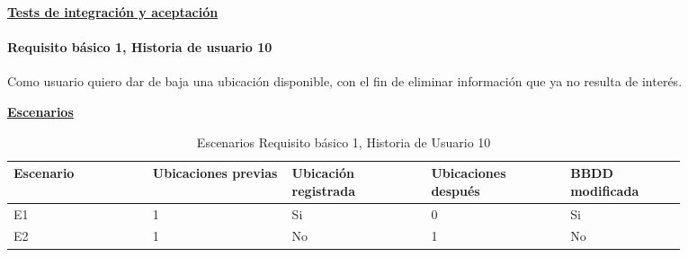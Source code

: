 \documentclass[../ei103948-project-documentation.tex]{subfiles}
\begin{document}
				\newpage

				\begin{center}
					\textbf{\underline{Tests de integración y aceptación}}
				\end{center}

				\testBasicoI

				\newpage


				\paragraph{Requisito básico 1, Historia de usuario 10}
				Como usuario quiero dar de baja una ubicación disponible, con el fin de eliminar información que ya no resulta de interés.

					\begin{center}
					\textbf{\underline{Escenarios}}
					\begin{table}[H]
						\centering
						\begin{tabular}{|p{0.18\linewidth}|p{0.18\linewidth}|p{0.18\linewidth}|p{0.18\linewidth}|p{0.15\linewidth}|}
							\hline
							\textbf{Escenario} & \textbf{Ubicaciones previas} & \textbf{Ubicación registrada} & \textbf{Ubicaciones después} & \textbf{BBDD modificada} \\ \hline
							E1                 & 1                        & Si                        & 0                        & Si                       \\ \hline
							E2                 & 1                        & No                        & 1                        & No                       \\ \hline
							\end{tabular}
						\caption{Escenarios Requisito básico 1, Historia de Usuario 10}
					\end{table}

					\descripcionBasicaJ


\end{center}
\end{document}
